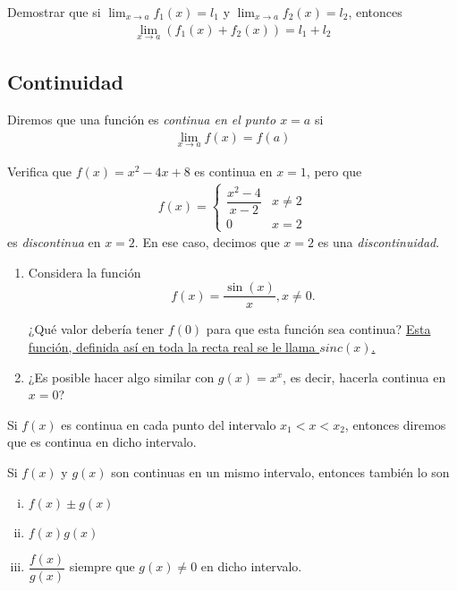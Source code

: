 \begin{resuelto}
	Demostrar que si $\lim_{x\to a}f_{1}(x)=l_{1}$ y $\lim_{x\to a}f_{2}(x)=l_{2}$, entonces
	\begin{align*}
		\lim_{x\to a}\left( f_{1}(x)+f_{2}(x) \right)=l_{1}+l_{2}
	\end{align*}
\end{resuelto}


\subsection{Continuidad}

  Diremos que una función es \emph{continua en el punto $x=a$} si
  \begin{align*}
   \lim_{x\to a} f(x)=f(a)
   \end{align*}

  \begin{resuelto}
   Verifica que $f(x)=x^{2}-4x+8$ es continua en $x=1$, pero que
   \begin{align*}
   f(x)=
    \begin{cases}
\dfrac{x^2-4}{x-2}& x\neq 2\\
0 & x= 2
\end{cases}
    \end{align*}
    es \emph{discontinua} en $x=2$.    En ese caso, decimos que $x=2$ es una \emph{discontinuidad}.
  \end{resuelto}

\begin{resuelto}

 \begin{enumerate}
 	\item Considera la función
 	\[ f(x) = \dfrac{\sin(x)}{x}, x\neq 0 .\]

 	¿Qué valor debería tener $ f(0) $ para que esta función sea continua? \href{https://mathworld.wolfram.com/SincFunction.html}{Esta función, definida así en toda la recta real se le llama $ sinc(x) $. }
 	\item ¿Es posible hacer algo similar con
 	$ g(x) = x^x $, es decir, hacerla continua en $ x=0 $?
 \end{enumerate}
\end{resuelto}

\begin{definicion}
	Si $f(x)$ es continua en cada punto del intervalo $x_{1}<x<x_{2}$, entonces diremos que es continua en dicho intervalo.
\end{definicion}

  \begin{proposicion}
   Si $f(x)$ y $g(x)$ son continuas en un mismo intervalo, entonces también lo son
   \begin{enumerate}[(i)]
     \item $f(x)\pm g(x)$

     \item $f(x)g(x)$

     \item $\dfrac{f(x)}{g(x)}$ siempre que $g(x)\neq 0$ en dicho intervalo.
\end{enumerate}
  \end{proposicion}

